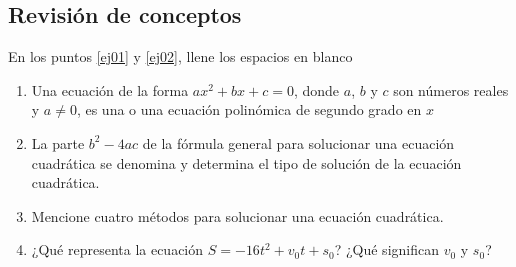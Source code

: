 \documentclass[letterpaper,11pt,twoside]{article}
\begin{document}
\subsection*{Revisión de conceptos}
En los puntos \ref{ej01} y \ref{ej02}, llene los espacios en blanco
\begin{enumerate}
\item \label{ej01} Una ecuación de la forma $ax^{2}+bx+c=0$, donde $a$, $b$ y $c$ son números reales y $a\neq 0$, es una \underline{\hspace{1cm}} o una ecuación polinómica de segundo grado en $x$
\item \label{ej02} La parte $b^{2}-4ac$ de la fórmula general para solucionar una ecuación cuadrática se denomina \underline{\hspace*{1cm}} y determina el tipo de solución de la ecuación cuadrática.
\item Mencione cuatro métodos para solucionar una ecuación cuadrática.
\item ¿Qué representa la ecuación $S=-16t^{2}+v_{0}t+s_{0}$? ¿Qué significan $v_{0}$ y $s_{0}$?
\end{enumerate}
\end{document}
